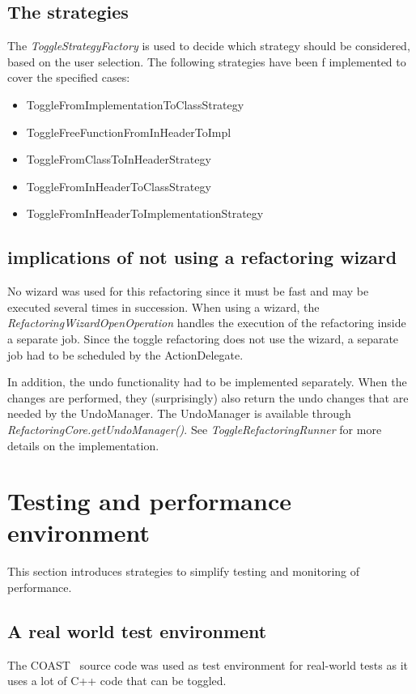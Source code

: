 \subsection{The strategies}
The \textit{ToggleStrategyFactory} is used to decide which strategy should be 
considered, based on the user selection. The following strategies have been f
implemented to cover the specified cases:

\begin{itemize}
\item ToggleFromImplementationToClassStrategy
\item ToggleFreeFunctionFromInHeaderToImpl
\item ToggleFromClassToInHeaderStrategy
\item ToggleFromInHeaderToClassStrategy
\item ToggleFromInHeaderToImplementationStrategy
\end{itemize}

\subsection{implications of not using a refactoring wizard}
No wizard was used for this refactoring since it must be fast and may be 
executed several times in succession. When using a wizard, the 
\textit{RefactoringWizardOpenOperation} handles the execution of the refactoring 
inside a separate job. Since the toggle refactoring does not use the wizard, a 
separate job had to be scheduled by the ActionDelegate.

In addition, the undo functionality had to be implemented separately. When the 
changes are performed, they (surprisingly) also return the undo changes that are 
needed by the UndoManager. The UndoManager is available through 
\textit{RefactoringCore.getUndoManager()}. See \textit{ToggleRefactoringRunner} 
for more details on the implementation.

\section{Testing and performance environment}

This section introduces strategies to simplify testing and monitoring of 
performance.

\subsection{A real world test environment}
The COAST~\cite{COAST} source code was used as test environment for real-world 
tests as it uses a lot of C++ code that can be toggled.

